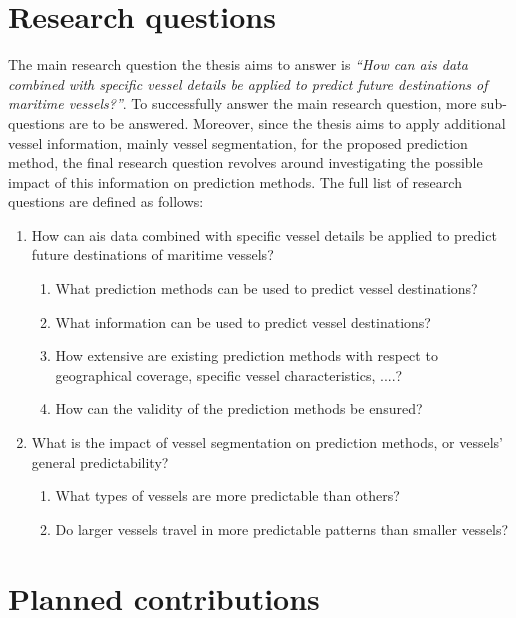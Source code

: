 \section{Research questions}
\label{sec:research_questions}

The main research question the thesis aims to answer is \textit{``How can \acrshort{ais} data combined with specific vessel details be applied to predict future destinations of maritime vessels?''}. To successfully answer the main research question, more sub-questions are to be answered. Moreover, since the thesis aims to apply additional vessel information, mainly vessel segmentation, for the proposed prediction method, the final research question revolves around investigating the possible impact of this information on prediction methods. The full list of research questions are defined as follows:

\begin{enumerate}
    \item How can \acrshort{ais} data combined with specific vessel details be applied to predict future destinations of maritime vessels?
    \begin{enumerate}
    \item What prediction methods can be used to predict vessel destinations?
    \item What information can be used to predict vessel destinations?
    \item How extensive are existing prediction methods with respect to geographical coverage, specific vessel characteristics, ....?
    \item How can the validity of the prediction methods be ensured?
    \end{enumerate}
    \item What is the impact of vessel segmentation on prediction methods, or vessels' general predictability?
    \begin{enumerate}
    \item What types of vessels are more predictable than others?
    \item Do larger vessels travel in more predictable patterns than smaller vessels?
    \end{enumerate}
\end{enumerate}

\section{Planned contributions}

